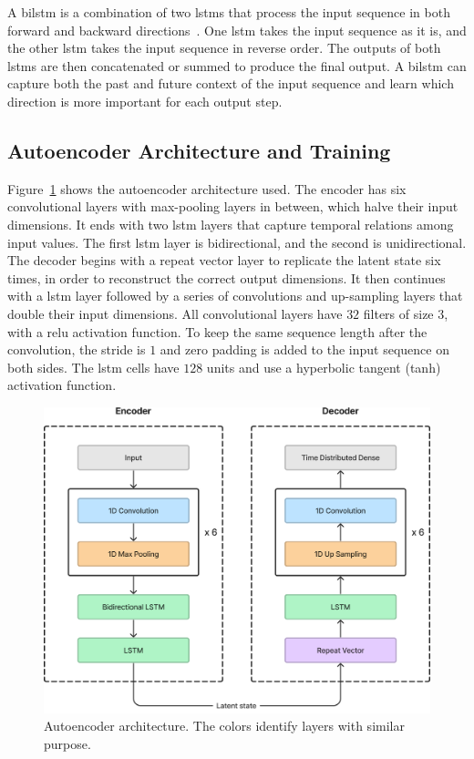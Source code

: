 A \acrfull{bilstm} is a combination of two \acrshort{lstm}s that process the input sequence in both forward and backward directions~\parencite{schuster_bidirectional_1997}. One \acrshort{lstm} takes the input sequence as it is, and the other \acrshort{lstm} takes the input sequence in reverse order. The outputs of both \acrshort{lstm}s are then concatenated or summed to produce the final output. A \acrshort{bilstm} can capture both the past and future context of the input sequence and learn which direction is more important for each output step.

\subsection{Autoencoder Architecture and Training}

Figure~\ref{fig:autoencoder_architecture} shows the autoencoder architecture used. The encoder has six convolutional layers with max-pooling layers in between, which halve their input dimensions. It ends with two \acrshort{lstm} layers that capture temporal relations among input values. The first \acrshort{lstm} layer is bidirectional, and the second is unidirectional. The decoder begins with a repeat vector layer to replicate the latent state six times, in order to reconstruct the correct output dimensions. It then continues with a \acrshort{lstm} layer followed by a series of convolutions and up-sampling layers that double their input dimensions. All convolutional layers have $32$ filters of size $3$, with a \acrfull{relu} activation function. To keep the same sequence length after the convolution, the stride is $1$ and zero padding is added to the input sequence on both sides. The \acrshort{lstm} cells have $128$ units and use a hyperbolic tangent (tanh) activation function.

\begin{figure}
    \centering
    \includegraphics[width=.8\linewidth]{images/autoencoder.png}
    \caption{Autoencoder architecture. The colors identify layers with similar purpose.}
    \label{fig:autoencoder_architecture}
\end{figure}

